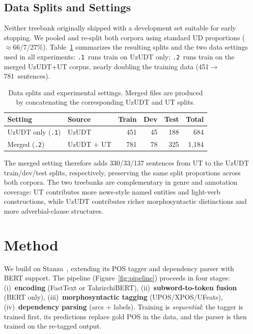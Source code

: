 \documentclass[runningheads]{llncs}
\begin{document}
\subsection{Data Splits and Settings}
\label{sec:data_splits}

Neither treebank originally shipped with a development set suitable for early stopping.
We pooled and re-split both corpora using standard UD proportions (${\approx}$66/7/27\%).
Table~\ref{tab:data_splits} summarizes the resulting splits and the two data settings used in all experiments:
\texttt{.1}~runs train on UzUDT only; \texttt{.2}~runs train on the merged UzUDT+UT corpus, nearly doubling the training data (451$\to$781~sentences).

\begin{table}[t]
\centering
\small
\caption{Data splits and experimental settings.
Merged files are produced by concatenating the corresponding UzUDT and UT splits.}
\label{tab:data_splits}
\begin{tabular}{llrrr|r}
\toprule
\textbf{Setting} & \textbf{Source} & \textbf{Train} & \textbf{Dev} & \textbf{Test} & \textbf{Total} \\
\midrule
UzUDT only (\texttt{.1}) & UzUDT        & 451 & 45  & 188 & 684   \\
Merged (\texttt{.2})      & UzUDT + UT   & 781 & 78  & 325 & 1{,}184 \\
\bottomrule
\end{tabular}
\end{table}
The merged setting therefore adds 330/33/137 sentences from UT to the UzUDT train/dev/test splits, respectively, preserving the same split proportions across both corpora.
The two treebanks are complementary in genre and annotation coverage: UT contributes more news-style named entities and light-verb constructions, while UzUDT contributes richer morphosyntactic distinctions and more adverbial-clause structures.


\section{Method}
\label{sec:method}

We build on Stanza~\cite{qi-etal-2020-stanza}, extending its POS tagger and dependency parser with BERT support.
The pipeline (Figure~\ref{fig:pipeline}) proceeds in four stages:
(i)~\textbf{encoding} (FastText or TahrirchiBERT),
(ii)~\textbf{subword-to-token fusion} (BERT only),
(iii)~\textbf{morphosyntactic tagging} (UPOS/XPOS/UFeats),
(iv)~\textbf{dependency parsing} (arcs + labels).
Training is \emph{sequential}: the tagger is trained first, its predictions replace gold POS in the data, and the parser is then trained on the re-tagged output.
\end{document}
